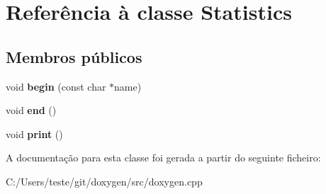 \hypertarget{class_statistics}{\section{Referência à classe Statistics}
\label{class_statistics}
}
\subsection*{Membros públicos}
\begin{DoxyCompactItemize}
\item 
\hypertarget{class_statistics_a70e3034e125e1ed33fb4772e88fb6bef}{void {\bfseries begin} (const char $\ast$name)}\label{class_statistics_a70e3034e125e1ed33fb4772e88fb6bef}

\item 
\hypertarget{class_statistics_aaf81d3fdaf258088d7692fa70cece087}{void {\bfseries end} ()}\label{class_statistics_aaf81d3fdaf258088d7692fa70cece087}

\item 
\hypertarget{class_statistics_a388f572c62279f839ee138a9afbdeeb5}{void {\bfseries print} ()}\label{class_statistics_a388f572c62279f839ee138a9afbdeeb5}

\end{DoxyCompactItemize}


A documentação para esta classe foi gerada a partir do seguinte ficheiro\-:\begin{DoxyCompactItemize}
\item 
C\-:/\-Users/teste/git/doxygen/src/doxygen.\-cpp\end{DoxyCompactItemize}
